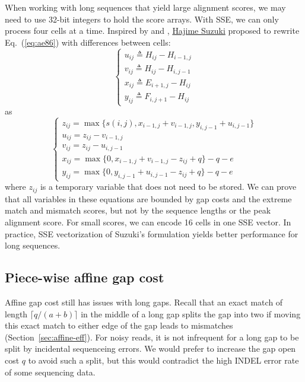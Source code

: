 \documentclass{bioinfo}
\begin{document}
\begin{methods}
When working with long sequences that yield large alignment scores,
we may need to use 32-bit integers to hold the score arrays. With SSE, we can
only process four cells at a time. Inspired by \citet{Myers:1999aa} and
\citet{Loving:2014aa}, \href{https://github.com/ocxtal}{Hajime Suzuki} proposed
to rewrite Eq.~(\ref{eq:ae86}) with differences between cells:
\begin{equation}
\left\{\begin{array}{l}
u_{ij}\triangleq H_{ij}-H_{i-1,j}\\
v_{ij}\triangleq H_{ij}-H_{i,j-1}\\
x_{ij}\triangleq E_{i+1,j}-H_{ij}\\
y_{ij}\triangleq F_{i,j+1}-H_{ij}
\end{array}\right.
\end{equation}
as
\begin{equation}\label{eq:suzuki}
\left\{\begin{array}{l}
z_{ij}=\max\{s(i,j),x_{i-1,j}+v_{i-1,j},y_{i,j-1}+u_{i,j-1}\}\\
u_{ij}=z_{ij}-v_{i-1,j}\\
v_{ij}=z_{ij}-u_{i,j-1}\\
x_{ij}=\max\{0,x_{i-1,j}+v_{i-1,j}-z_{ij}+q\}-q-e\\
y_{ij}=\max\{0,y_{i,j-1}+u_{i,j-1}-z_{ij}+q\}-q-e
\end{array}\right.
\end{equation}
where $z_{ij}$ is a temporary variable that does not need to be stored.  We can
prove that all variables in these equations are bounded by gap costs and the
extreme match and mismatch scores, but not by the sequence lengths or the peak
alignment score. For small scores, we can encode 16 cells in one SSE vector. In
practice, SSE vectorization of Suzuki's formulation yields better performance
for long sequences.

\subsection{Piece-wise affine gap cost}

Affine gap cost still has issues with long gaps. Recall that an exact match of
length $\lceil q/(a+b)\rceil$ in the middle of a long gap splits the gap into
two if moving this exact match to either edge of the gap leads to mismatches
(Section~\ref{sec:affine-eff}). For noisy reads, it is not infrequent for a
long gap to be split by incidental sequenceing errors. We would prefer to
increase the gap open cost $q$ to avoid such a split, but this would contradict
the high INDEL error rate of some sequencing data.


\end{methods}
\end{document}
